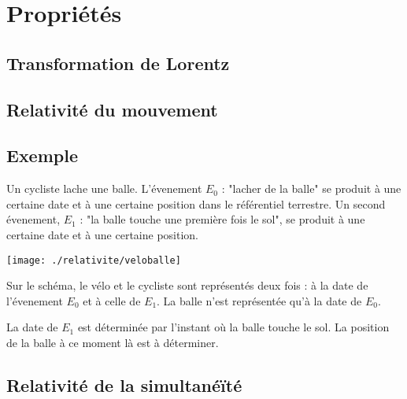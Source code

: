 
\section{Propriétés}

\subsection{Transformation de Lorentz}

\subsection{Relativité du mouvement}

\subsection{Exemple}
Un cycliste lache une balle. L'évenement $E_0$ : "lacher de la balle" se produit à une certaine date et à une certaine position dans le référentiel terrestre. Un second évenement, $E_1$ : "la balle touche une première fois le sol", se produit à une certaine date et à une certaine position.

\begin{center}
\texttt{[image: ./relativite/veloballe]}
\end{center}

Sur le schéma, le vélo et le cycliste sont représentés deux fois : à la date de l'évenement $E_0$ et à celle de $E_1$. La balle n'est représentée qu'à la date de $E_0$.

La date de $E_1$ est déterminée par l'instant où la balle touche le sol. La position de la balle à ce moment là est à déterminer.

\subsection{Relativité de la simultanéïté}

%
